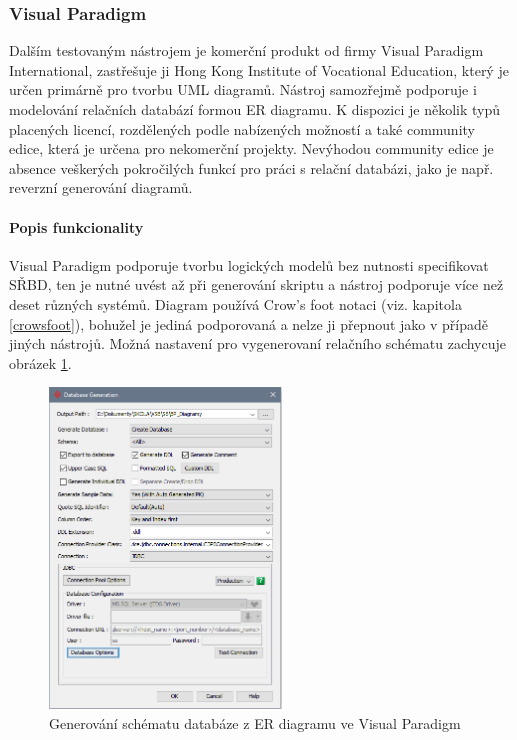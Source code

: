\documentclass[czech,bachelor,public,dept460,male,oneside]{diploma}
\begin{document}
		\subsubsection{Visual Paradigm}
		Dalším testovaným nástrojem je komerční produkt od firmy Visual Paradigm International, zastřešuje ji Hong Kong Institute of Vocational Education, který je určen primárně pro tvorbu UML diagramů. Nástroj samozřejmě podporuje i modelování relačních databází formou ER diagramu. K dispozici je několik typů placených licencí, rozdělených podle nabízených možností a také community edice, která je určena pro nekomerční projekty. Nevýhodou community edice je absence veškerých pokročilých funkcí pro práci s relační databázi, jako je např. reverzní generování diagramů.
		
		\paragraph{Popis funkcionality}
		Visual Paradigm podporuje tvorbu logických modelů bez nutnosti specifikovat SŘBD, ten je nutné uvést až při generování skriptu a nástroj podporuje více než deset různých systémů. Diagram používá Crow's foot notaci (viz. kapitola \ref{crowsfoot}), bohužel je jediná podporovaná a nelze ji přepnout jako v případě jiných nástrojů. Možná nastavení pro vygenerovaní relačního schématu zachycuje obrázek \ref{fig:editVP}.
		
		\begin{figure}[H]
			\centering
			\includegraphics[width=0.55\textwidth]{Figures/EditorVP}
			\caption[Generování schématu databáze z ER diagramu ve Visual Paradigm]{Generování schématu databáze z ER diagramu ve Visual Paradigm}
			\label{fig:editVP}
		\end{figure}
		
\end{document}
